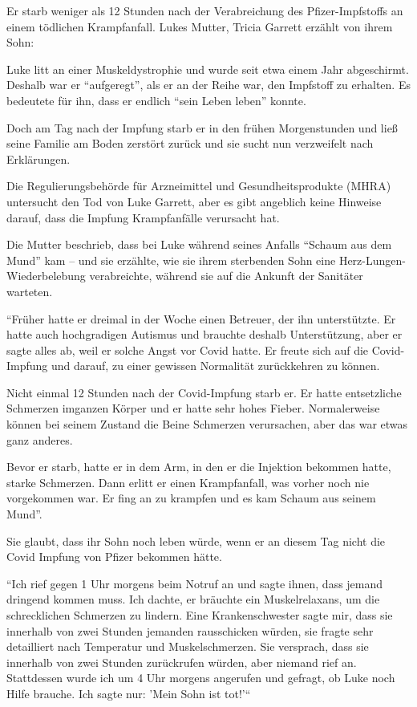 Er starb weniger als 12 Stunden nach der Verabreichung des Pfizer-Impfstoffs an
einem tödlichen Krampfanfall. Lukes Mutter, Tricia Garrett erzählt von ihrem
Sohn:

Luke litt an einer Muskeldystrophie und wurde seit etwa einem Jahr
abgeschirmt. Deshalb war er ``aufgeregt'', als er an der Reihe war, den
Impfstoff zu erhalten. Es bedeutete für ihn, dass er endlich ``sein Leben
leben'' konnte.

Doch am Tag nach der Impfung starb er in den frühen Morgenstunden und ließ seine
Familie am Boden zerstört zurück und sie sucht nun verzweifelt nach Erklärungen.

Die Regulierungsbehörde für Arzneimittel und Gesundheitsprodukte (MHRA)
untersucht den Tod von Luke Garrett, aber es gibt angeblich keine Hinweise
darauf, dass die Impfung Krampfanfälle verursacht hat.

Die Mutter beschrieb, dass bei Luke während seines Anfalls ``Schaum aus dem
Mund'' kam – und sie erzählte, wie sie ihrem sterbenden Sohn eine
Herz-Lungen-Wiederbelebung verabreichte, während sie auf die Ankunft der
Sanitäter warteten.

``Früher hatte er dreimal in der Woche einen Betreuer, der ihn unterstützte. Er
hatte auch hochgradigen Autismus und brauchte deshalb Unterstützung, aber er
sagte alles ab, weil er solche Angst vor Covid hatte. Er freute sich auf die
Covid-Impfung und darauf, zu einer gewissen Normalität zurückkehren zu können.

Nicht einmal 12 Stunden nach der Covid-Impfung starb er. Er hatte entsetzliche
Schmerzen imganzen Körper und er hatte sehr hohes Fieber. Normalerweise können
bei seinem Zustand die Beine Schmerzen verursachen, aber das war etwas ganz
anderes.

Bevor er starb, hatte er in dem Arm, in den er die Injektion bekommen hatte,
starke Schmerzen. Dann erlitt er einen Krampfanfall, was vorher noch nie
vorgekommen war. Er fing an zu krampfen und es kam Schaum aus seinem Mund''.

Sie glaubt, dass ihr Sohn noch leben würde, wenn er an diesem Tag nicht die
Covid Impfung von Pfizer bekommen hätte.

``Ich rief gegen 1 Uhr morgens beim Notruf an und sagte ihnen, dass jemand
dringend kommen muss. Ich dachte, er bräuchte ein Muskelrelaxans, um die
schrecklichen Schmerzen zu lindern. Eine Krankenschwester sagte mir, dass sie
innerhalb von zwei Stunden jemanden rausschicken würden, sie fragte sehr
detailliert nach Temperatur und Muskelschmerzen. Sie versprach, dass sie
innerhalb von zwei Stunden zurückrufen würden, aber niemand rief an. Stattdessen
wurde ich um 4 Uhr morgens angerufen und gefragt, ob Luke noch Hilfe
brauche. Ich sagte nur: 'Mein Sohn ist tot!'``

